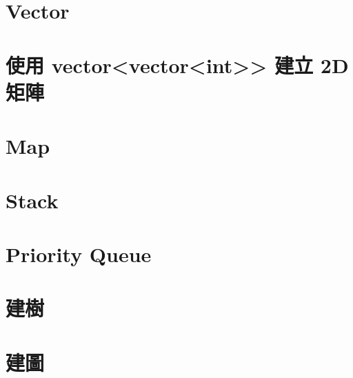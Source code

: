\documentclass{article}
\begin{document}
\tableofcontents  %
\newpage  %
\begin{multicols}{2}

\section{Vector}




\section{使用 vector<vector<int>> 建立 2D 矩陣}



\section{Map}



\section{Stack}



\section{Priority Queue}



\section{建樹}



\section{建圖}




\end{multicols}
\end{document}
